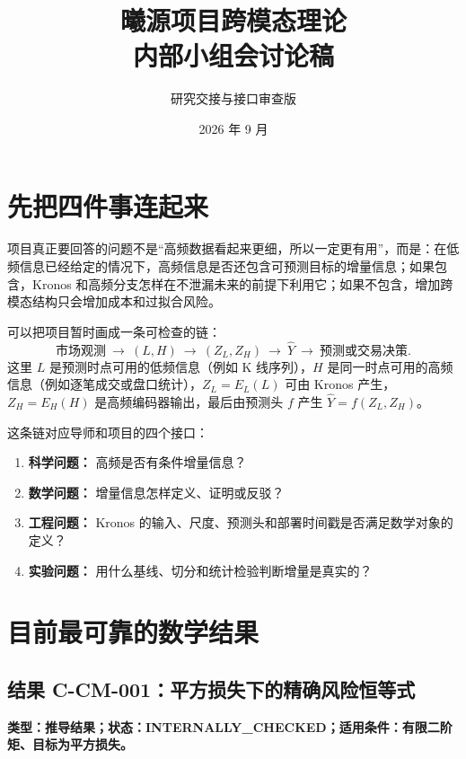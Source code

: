 \documentclass[UTF8,11pt,a4paper]{ctexart}
\title{曦源项目跨模态理论\\内部小组会讨论稿}
\author{研究交接与接口审查版}
\date{2026 年 9 月}
\begin{document}
\maketitle
\begin{center}
\end{center}

\section{先把四件事连起来}

项目真正要回答的问题不是“高频数据看起来更细，所以一定更有用”，而是：在低频信息已经给定的情况下，高频信息是否还包含可预测目标的增量信息；如果包含，Kronos 和高频分支怎样在不泄漏未来的前提下利用它；如果不包含，增加跨模态结构只会增加成本和过拟合风险。

可以把项目暂时画成一条可检查的链：
\[
 \text{市场观测}\ \longrightarrow\ (L,H)\ \longrightarrow\ (Z_L,Z_H)\ \longrightarrow\ \widehat Y\ \longrightarrow\ \text{预测或交易决策}.
\]
这里 $L$ 是预测时点可用的低频信息（例如 K 线序列），$H$ 是同一时点可用的高频信息（例如逐笔成交或盘口统计），$Z_L=E_L(L)$ 可由 Kronos 产生，$Z_H=E_H(H)$ 是高频编码器输出，最后由预测头 $f$ 产生 $\widehat Y=f(Z_L,Z_H)$。

这条链对应导师和项目的四个接口：
\begin{enumerate}
  \item \textbf{科学问题：} 高频是否有条件增量信息？
  \item \textbf{数学问题：} 增量信息怎样定义、证明或反驳？
  \item \textbf{工程问题：} Kronos 的输入、尺度、预测头和部署时间戳是否满足数学对象的定义？
  \item \textbf{实验问题：} 用什么基线、切分和统计检验判断增量是真实的？
\end{enumerate}

\section{目前最可靠的数学结果}

\subsection{结果 C-CM-001：平方损失下的精确风险恒等式}
\textbf{类型：推导结果；状态：INTERNALLY\_CHECKED；适用条件：有限二阶矩、目标为平方损失。}
\end{document}
